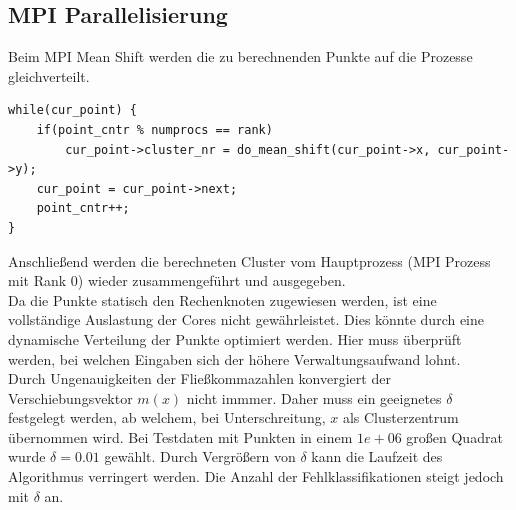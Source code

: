 	\subsection{MPI Parallelisierung}
	Beim MPI Mean Shift werden die zu berechnenden Punkte auf die Prozesse gleichverteilt.
	\begin{lstlisting}
while(cur_point) {
    if(point_cntr % numprocs == rank)
        cur_point->cluster_nr = do_mean_shift(cur_point->x, cur_point->y);
    cur_point = cur_point->next;
    point_cntr++;
}
	\end{lstlisting}
	Anschließend werden die berechneten Cluster vom Hauptprozess (MPI Prozess mit Rank 0) wieder zusammengeführt und ausgegeben.\\
	Da die Punkte statisch den Rechenknoten zugewiesen werden, ist eine vollständige Auslastung der Cores nicht gewährleistet. 
	Dies könnte durch eine dynamische Verteilung der Punkte optimiert werden. Hier muss überprüft werden, bei welchen Eingaben
	sich der höhere Verwaltungsaufwand lohnt.\\
	Durch Ungenauigkeiten der Fließkommazahlen konvergiert der Verschiebungsvektor $ m(x) $ nicht immmer. Daher muss ein geeignetes $ \delta $
	festgelegt werden, ab welchem, bei Unterschreitung, $ x $ als Clusterzentrum übernommen wird. Bei Testdaten mit Punkten in einem 
	$ 1e + 06 $ großen Quadrat wurde $ \delta = 0.01 $ gewählt. Durch Vergrößern von $ \delta $ kann die Laufzeit des Algorithmus verringert werden.
	Die Anzahl der Fehlklassifikationen steigt jedoch mit $ \delta $ an.\\
	\vspace{-10pt}
